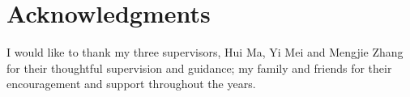 \chapter*{Acknowledgments}\label{C:ack} 
I would like to thank my three supervisors, Hui Ma, Yi Mei and Mengjie Zhang for their thoughtful supervision
and guidance; my family and friends for their encouragement and support throughout the years.
